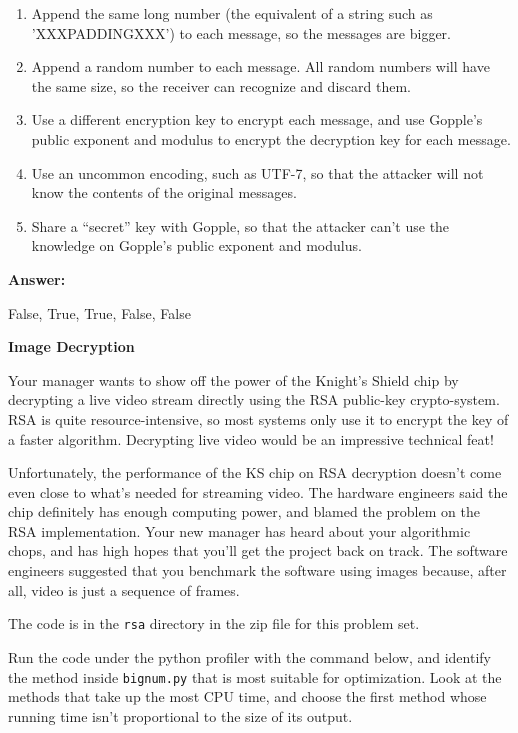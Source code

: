 \documentclass[12pt,twoside]{article}
\newcommand{\answer}{
 \par\medskip
 \textbf{Answer:}
}
\newcommand{\answerIIf}{ \answer
False, True, True, False, False
}
\begin{document}
\begin{problems}
\begin {problemparts}
\begin{enumerate}
  \item Append the same long number (the equivalent of a string such as
  'XXXPADDINGXXX') to each message, so the messages are bigger.
  \item Append a random number to each message. All random numbers will have the
  same size, so the receiver can recognize and discard them.
  \item Use a different encryption key to encrypt each message, and use Gopple's
  public exponent and modulus to encrypt the decryption key for each message.
  \item Use an uncommon encoding, such as UTF-7, so that the attacker will not
  know the contents of the original messages.
  \item Share a ``secret'' key with Gopple, so that the attacker can't use the
  knowledge on Gopple's public exponent and modulus.
\end{enumerate}
\answerIIf

\end{problemparts}

\newpage

\problem {} \textbf{Image Decryption}

Your manager wants to show off the power of the Knight's Shield chip by
decrypting a live video stream directly using the RSA public-key crypto-system.
RSA is quite resource-intensive, so most systems only use it to encrypt the key
of a faster algorithm. Decrypting live video would be an impressive technical
feat!

Unfortunately, the performance of the KS chip on RSA decryption doesn't come
even close to what's needed for streaming video. The hardware engineers said the
chip definitely has enough computing power, and blamed the problem on the
RSA implementation. Your new manager has heard about your algorithmic chops, and
has high hopes that you'll get the project back on track. The software engineers
suggested that you benchmark the software using images because, after all, video
is just a sequence of frames.

The code is in the \texttt{rsa} directory in the zip file for this problem set.

\begin{problemparts}
\problempart {} Run the code under the python profiler with the command
below, and identify the method inside \texttt{bignum.py} that is most suitable
for optimization. Look at the methods that take up the most CPU time, and
choose the first method whose running time isn't proportional to the size of its
output.


\end{problemparts}
\end{problems}
\end{document}
